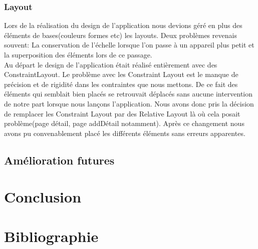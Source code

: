 \documentclass[12pt,a4paper]{report}
\begin{document}
\subsection{Layout}
\begin{flushleft}
\justify
Lors de la réalisation du design de l'application nous devions géré en plus des éléments de bases(couleurs formes etc) les layouts. Deux problèmes revenais souvent: La conservation de l'échelle lorsque l'on passe à un appareil plus petit et la superposition des éléments lors de ce passage.\\
Au départ le design de l'application était réalisé entièrement avec des ConstraintLayout. Le problème avec les Constraint Layout est le manque de précision et de rigidité dans les contraintes que nous mettons. De ce fait des éléments qui semblait bien placés se retrouvait déplacés sans aucune intervention de notre part lorsque nous lançons l'application. Nous avons donc pris la décision de remplacer les Constraint Layout par des Relative Layout là où cela posait problème(page détail, page addDétail notamment). Après ce changement nous avons pu convenablement placé les différents éléments sans erreurs apparentes.
\end{flushleft}
\section{Amélioration futures}
\newpage
\chapter{Conclusion}
\newpage
\chapter{Bibliographie}
\end{document}
